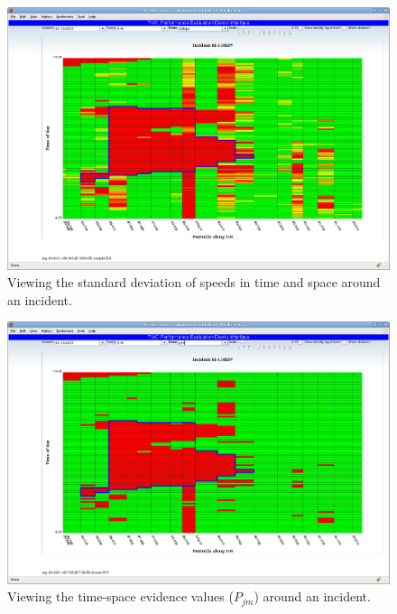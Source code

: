 \documentclass[12pt]{report}
\begin{document}
\begin{figure}[t]
  \centering
  \includegraphics[width=\textwidth]{images/i61-5-n-stdspd.png}
  \caption{Viewing the standard deviation of speeds in time and space around an incident.}
  \label{fig:view-stddev}
\end{figure}

\begin{figure}[t]
  \centering
  \includegraphics[width=\textwidth]{images/i61-5-n-pjm.png}
  \caption{Viewing the time-space evidence values ($P_{jm}$) around an incident.}
  \label{fig:view-pjm}
\end{figure}
\end{document}
